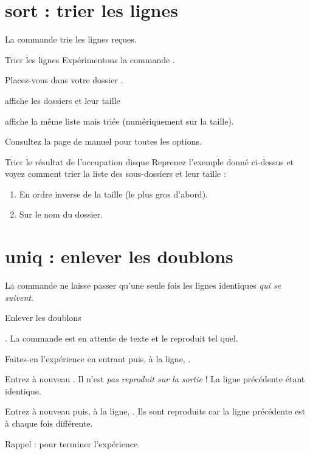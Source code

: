 \documentclass[a4paper,11pt]{style-esi/td}
\begin{document}
	\section{sort : trier les lignes}

		La commande  trie les lignes reçues.

		\begin{Experience}{Trier les lignes}
			Expérimentons la commande .
			\begin{steps}
			\item 
				Placez-vous dans votre dossier .
			\item 
				affiche les dossiers et leur taille
			\item 
				affiche la même liste mais triée (numériquement sur la taille).
			\end{steps}
			Consultez la page de manuel pour toutes les options.
		\end{Experience}

		\begin{Exercice}{Trier le résultat de l'occupation disque}
			Reprenez l'exemple donné ci-dessus et voyez comment trier
			la liste des sous-dossiers et leur taille :
			\begin{enumerate}
			\item En ordre inverse de la taille (le plus gros d'abord).
			\item Sur le nom du dossier.
			\end{enumerate}
		\end{Exercice}

	\section{uniq : enlever les doublons}

		La commande  ne laisse passer qu'une seule fois
		les lignes identiques \emph{qui se suivent}.

		\begin{Experience}{Enlever les doublons}
			\begin{steps}
			\item 
				\kbd{cat | uniq}.
				La commande est en attente de texte et le reproduit tel quel.
			\item 
				Faites-en l'expérience en entrant  puis, à la ligne,
				\kbd{hello}.
			\item 
				Entrez à nouveau \kbd{hello}.
				Il n'est \emph{pas reproduit sur la sortie} !
				La ligne précédente étant identique.
			\item 
				Entrez à nouveau   puis, à la ligne, \kbd{hello}.
				Ils sont reproduits car la ligne précédente est à chaque fois
				différente.
			\item 
				Rappel :  pour terminer l'expérience.
			\end{steps}
		\end{Experience}
\end{document}
